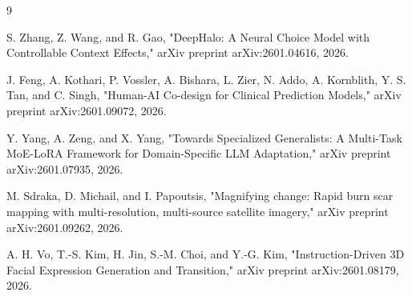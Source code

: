 \documentclass{article}
\begin{document}
\begin{thebibliography}{9}

 S. Zhang, Z. Wang, and R. Gao, "DeepHalo: A Neural Choice Model with Controllable Context Effects," arXiv preprint arXiv:2601.04616, 2026.

 J. Feng, A. Kothari, P. Vossler, A. Bishara, L. Zier, N. Addo, A. Kornblith, Y. S. Tan, and C. Singh, "Human-AI Co-design for Clinical Prediction Models," arXiv preprint arXiv:2601.09072, 2026.

 Y. Yang, A. Zeng, and X. Yang, "Towards Specialized Generalists: A Multi-Task MoE-LoRA Framework for Domain-Specific LLM Adaptation," arXiv preprint arXiv:2601.07935, 2026.

 M. Sdraka, D. Michail, and I. Papoutsis, "Magnifying change: Rapid burn scar mapping with multi-resolution, multi-source satellite imagery," arXiv preprint arXiv:2601.09262, 2026.

 A. H. Vo, T.-S. Kim, H. Jin, S.-M. Choi, and Y.-G. Kim, "Instruction-Driven 3D Facial Expression Generation and Transition," arXiv preprint arXiv:2601.08179, 2026.

\end{thebibliography}
\end{document}

